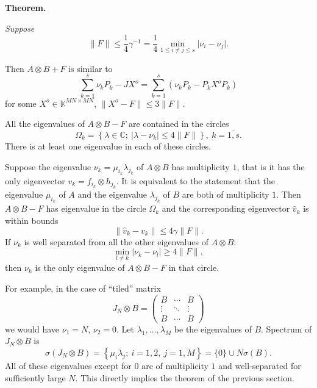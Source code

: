 \documentclass[a4paper]{jpconf}
\begin{document}
\begin{center}
\textbf{Theorem.}
{\it
    Suppose
    \[
        \|F\| \leq \frac14 \gamma^{-1} = \frac14 \min_{1\leq i{\neq}j\leq s}\lvert\nu_i - \nu_j\rvert.
    \]

    Then \( A{\otimes}B + F \) is similar to
    \[ \sum_{k=1}^s \nu_k P_k - JX^o = \sum_{k=1}^s (\nu_k P_k - P_k X^o P_k) \]
    for some \( X^o \in \mathbb{K}^{MN{\times}MN} \),
    \( \|X^o - F\|\leq 3\|F\| \).

    All the eigenvalues of \( A{\otimes}B - F \) are contained in the circles
    \[
        \Omega_k = \left\{
            \lambda\in\mathbb{C};
            \ \lvert\lambda - \nu_k\rvert \leq 4\|F\|
            \right\},
        \ k{=}\overline{1,s}.
    \]
    There is at least one eigenvalue in each of these circles.

    Suppose the eigenvalue \( \nu_k=\mu_{i_k}\lambda_{j_k} \) of \( A{\otimes}B \) has multiplicity \( 1 \),
        that is it has the only eigenvector \( v_k = f_{i_k}{\otimes}h_{j_k} \).
    It is equivalent to the statement that the eigenvalue \( \mu_{i_k} \)
        of \( A \) and the eigenvalue \( \lambda_{j_k} \) of \( B \)
        are both of multiplicity \( 1 \).
    Then \( A{\otimes}B - F \) has eigenvalue in the circle \( \Omega_k \)
        and the corresponding eigenvector \( \hat{v}_k \) is within bounds
    \[
        \|\hat{v}_k - v_k\| \leq 4\gamma \|F\|.
    \]
    If \( \nu_k \) is well separated from all the other eigenvalues of \( A{\otimes}B \):
    \[
        \min_{l\neq k}
        \lvert
        \nu_k - \nu_l
        \rvert
        \geq 4\|F\|,
    \]
    then \( \nu_k \) is the only eigenvalue of \( A{\otimes}B - F \)
    in that circle.
\/}
\end{center}

For example, in the case of ``tiled'' matrix
\[
    J_N{\otimes}B =
    \begin{pmatrix}
        B & \cdots & B \\
        \vdots & \ddots & \vdots \\
        B & \cdots & B
    \end{pmatrix}
\]
    we would have
    \( \nu_1=N \),
    \( \nu_2=0 \).
Let \( \lambda_1,\ldots,\lambda_M \)
    be the eigenvalues of \( B \).
Spectrum of \( J_N{\otimes}B \) is
    \[
        \sigma(J_N{\otimes}B) = \left\{ \mu_i\lambda_j;\ i{=}1,2,\ j{=}\overline{1,M}\right\} = \{0\}\cup N\sigma(B).
    \]
All of these eigenvalues except for \( 0 \)
    are of multiplicity \( 1 \)
    and well-separated for sufficiently large \( N \).
This directly implies the theorem of the previous section.
    
\end{document}
